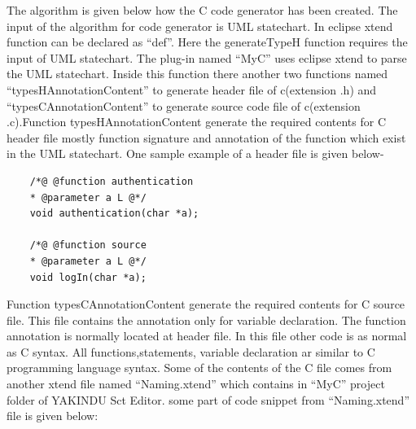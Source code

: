 The algorithm is given below how the C code generator has been created. The input of the algorithm for code generator is UML statechart. In eclipse xtend \cite{ref_20_xtend} function can be declared as \enquote{def}. Here the generateTypeH function requires the input of UML statechart. The plug-in named \enquote{MyC} uses eclipse xtend to parse the UML statechart. Inside this function there another two functions named \enquote{typesHAnnotationContent} to generate header file of c(extension .h) and \enquote{typesCAnnotationContent} to generate source code file of c(extension .c).Function typesHAnnotationContent generate the required contents for C header file mostly function signature and annotation of the function which exist in the UML statechart. One sample example of a header file is given below-

\begin{lstlisting}
	/*@ @function authentication
	* @parameter a L @*/
	void authentication(char *a);
	
	/*@ @function source
	* @parameter a L @*/
	void logIn(char *a);
\end{lstlisting}

Function typesCAnnotationContent generate the required contents for C source file. This file contains the annotation only for variable declaration. The function annotation is normally located at header file. In this file other code is as normal as C syntax. All functions,statements, variable declaration ar similar to C programming language syntax. Some of the contents of the C file comes from another xtend file named \enquote{Naming.xtend} which contains in \enquote{MyC} project folder of YAKINDU Sct Editor. some part of code snippet from \enquote{Naming.xtend} file is given below:


